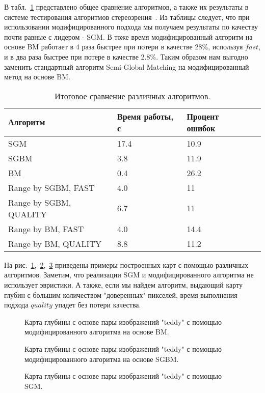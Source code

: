 В табл.~\ref{4} представлено общее сравнение алгоритмов, а также их результаты в системе тестирования алгоритмов стереозрения~\cite{middlebury}. Из таблицы следует, что при использовании модифицированного подхода мы получаем результаты по качеству почти равные с лидером - SGM. В тоже время модифицированный алгоритм на основе BM работает в 4 раза быстрее при потери в качестве 28\%, используя $fast$, и в два раза быстрее при потере в качестве 2.8\%. Таким образом нам выгодно заменить стандартный алгоритм Semi-Global Matching на модифицированный метод на основе BM. 
\begin{table}[h!]
   \caption{Итоговое сравнение различных алгоритмов.}
    \label{4}
    \begin{tabular}{ | l | l | l | p{5cm} |}
    \hline
    Алгоритм & Время работы, с & Процент ошибок \\ \hline
     SGM & 17.4 & 10.9  \\ \hline
    SGBM & 3.8 & 11.9  \\ \hline
    BM & 0.4 &  26.2 \\ \hline
    Range by SGBM, FAST& 4.0 & 11   \\ \hline
    Range by SGBM, QUALITY & 6.7 & 11  \\ \hline
    Range by BM, FAST & 4.0 & 14.4  \\ \hline
    Range by BM, QUALITY & 8.8 & 11.2  \\ 
    \hline
    \end{tabular}
\end{table}

На рис.~\ref{pic:6},~\ref{pic:7},~\ref{pic:8} приведены примеры построенных карт с помощью различных алгоритмов. Заметим, что реализации SGM и модифицированного алгоритма не использует эвристики. А также, если мы найдем алгоритм, выдающий карту глубин с большим количеством "доверенных" пикселей, время выполнения подхода $quality$ упадет без потери качества.

\begin{figure}[h!]
\caption{Карта глубины с основе пары изображений "teddy" с помощью модифицированного алгоритма на основе BM.}
\label{pic:6}
\end{figure}

\begin{figure}[h!]
\caption{Карта глубины с основе пары изображений "teddy" с помощью модифицированного алгоритма на основе SGBM.}
\label{pic:7}
\end{figure}

\begin{figure}[h!]
\caption{Карта глубины с основе пары изображений "teddy" с помощью SGM.}
\label{pic:8}
\end{figure}

\clearpage